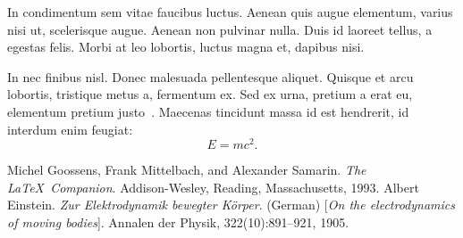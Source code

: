 \documentclass[a4paper,12pt]{article}
\begin{document}
In condimentum sem vitae faucibus luctus. Aenean quis augue elementum,
varius nisi ut, scelerisque augue. Aenean non pulvinar nulla. Duis id
laoreet tellus, a egestas felis. Morbi at leo lobortis, luctus magna
et, dapibus nisi. 


In nec finibus nisl. Donec malesuada pellentesque aliquet. Quisque et
arcu lobortis, tristique metus a, fermentum ex. Sed ex urna, pretium a
erat eu, elementum pretium justo~\cite{latexcompanion,einstein}. Maecenas
tincidunt massa id est hendrerit, id interdum enim feugiat:
%
\begin{displaymath}
  E = mc^2.
\end{displaymath}
%
\begin{thebibliography}{99}
%
Michel Goossens, Frank Mittelbach, and Alexander Samarin. 
\textit{The \LaTeX\ Companion}. 
Addison-Wesley, Reading, Massachusetts, 1993.
%
Albert Einstein. 
\textit{Zur Elektrodynamik bewegter K{\"o}rper}. (German) 
[\textit{On the electrodynamics of moving bodies}]. 
Annalen der Physik, 322(10):891–921, 1905.
%
\end{thebibliography}
%
\end{document}
